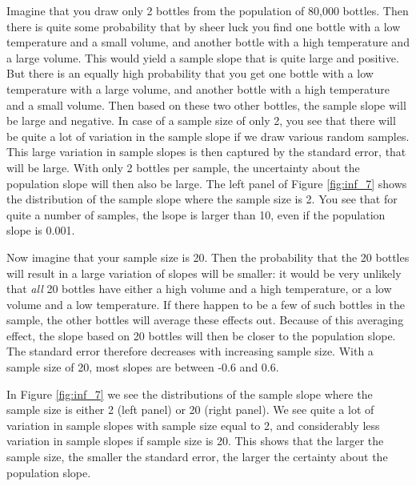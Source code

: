 \documentclass[]{report}\usepackage[]{graphicx}\usepackage[]{color}
\begin{document}
Imagine that you draw only 2 bottles from the population of 80,000 bottles. Then there is quite some probability that by sheer luck you find one bottle with a low temperature and a small volume, and another bottle with a high temperature and a large volume. This would yield a sample slope that is quite large and positive. But there is an equally high probability that you get one bottle with a low temperature with a large volume, and another bottle with a high temperature and a small volume. Then based on these two other bottles, the sample slope will be large and negative. In case of a sample size of only 2, you see that there will be quite a lot of variation in the sample slope if we draw various random samples. This large variation in sample slopes is then captured by the standard error, that will be large. With only 2 bottles per sample, the uncertainty about the population slope will then also be large. The left panel of Figure \ref{fig:inf_7} shows the distribution of the sample slope where the sample size is 2. You see that for quite a number of samples, the lsope is larger than 10, even if the population slope is 0.001.

Now imagine that your sample size is 20. Then the probability that the 20 bottles will result in a large variation of slopes will be smaller: it would be very unlikely that \textit{all} 20 bottles have either a high volume and a high temperature, or a low volume and a low temperature. If there happen to be a few of such bottles in the sample, the other bottles will average these effects out. Because of this averaging effect, the slope based on 20 bottles will then be closer to the population slope. The standard error therefore decreases with increasing sample size. With a sample size of 20, most slopes are between -0.6 and 0.6.

In Figure \ref{fig:inf_7} we see the distributions of the sample slope where the sample size is either 2 (left panel) or 20 (right panel). We see quite a lot of variation in sample slopes with sample size equal to 2, and considerably less variation in sample slopes if sample size is 20. This shows that the larger the sample size, the smaller the standard error, the larger the certainty about the population slope. 
\end{document}
